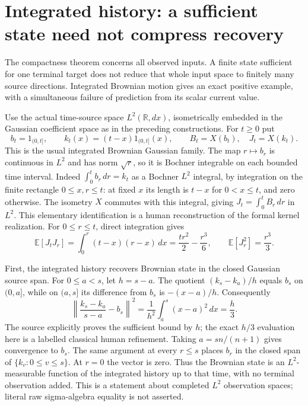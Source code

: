 \documentclass[11pt]{article}
\newcommand{\R}{\mathbb R}\newcommand{\E}{\mathbb E}
\begin{document}
\section{Integrated history: a sufficient state need not compress recovery}
The compactness theorem concerns all observed inputs. A finite state
sufficient for one terminal target does not reduce that whole input
space to finitely many source directions. Integrated Brownian motion
gives an exact positive example, with a simultaneous failure of prediction
from its scalar current value.

Use the actual time-source space $L^2(\R,dx)$, isometrically embedded
in the Gaussian coefficient space as in the preceding constructions.
For $t\geq0$ put
\[
 b_t=1_{(0,t]},\qquad k_t(x)=(t-x)1_{(0,t]}(x),\qquad
 B_t=X(b_t),\quad J_t=X(k_t).
\]
This is the usual integrated Brownian Gaussian family. The map $r\mapsto b_r$ is continuous in $L^2$ and has norm $\sqrt r$, so it is Bochner integrable on each bounded time interval. Indeed
$\int_0^t b_r\,dr=k_t$ as a Bochner $L^2$ integral, by integration
on the finite rectangle $0\leq x,r\leq t$: at fixed $x$ its length
is $t-x$ for $0<x\leq t$, and zero otherwise. The isometry $X$
commutes with this integral, giving $J_t=\int_0^tB_r\,dr$ in $L^2$.
This elementary identification is a human reconstruction of the
formal kernel realization. For $0\leq r\leq t$, direct integration
gives
\begin{equation}\label{eq:integratedcov}
 \E[J_tJ_r]=\int_0^r(t-x)(r-x)\,dx
              =\frac{tr^2}{2}-\frac{r^3}{6},\qquad
 \E[J_r^2]=\frac{r^3}{3}.
\end{equation}

First, the integrated history recovers Brownian state in the closed
Gaussian source span. For $0\leq a<s$, let $h=s-a$. The quotient
$(k_s-k_a)/h$ equals $b_s$ on $(0,a]$, while on $(a,s]$ its
difference from $b_s$ is $-(x-a)/h$. Consequently
\begin{equation}\label{eq:integratedderivative}
 \left\|\frac{k_s-k_a}{s-a}-b_s\right\|^2
       =\frac1{h^2}\int_a^s(x-a)^2\,dx=\frac h3.
\end{equation}
The source explicitly proves the sufficient bound by $h$; the exact
$h/3$ evaluation here is a labelled classical human refinement.
Taking $a=s n/(n+1)$ gives convergence to $b_s$. The same argument
at every $r\leq s$ places $b_r$ in the closed span of
$\{k_v:0\leq v\leq s\}$. At $r=0$ the vector is zero.
Thus the Brownian state is an $L^2$-measurable function of the
integrated history up to that time, with no terminal observation added.
This is a statement about completed $L^2$ observation spaces; literal
raw sigma-algebra equality is not asserted.
\end{document}
